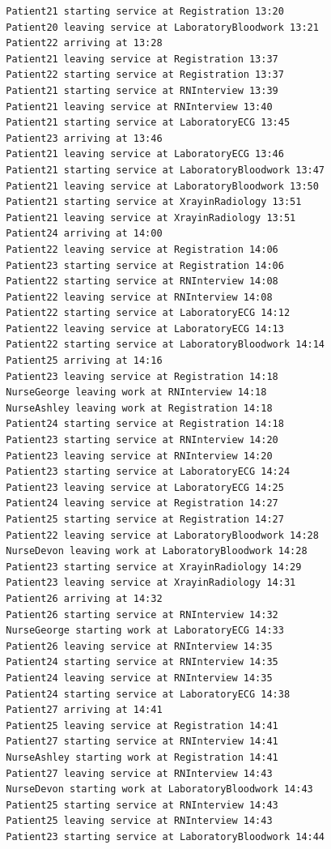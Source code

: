 \documentclass[12pt]{article}
\begin{document}
\begin{verbatim}
		Patient21 starting service at Registration 13:20
		Patient20 leaving service at LaboratoryBloodwork 13:21
		Patient22 arriving at 13:28
		Patient21 leaving service at Registration 13:37
		Patient22 starting service at Registration 13:37
		Patient21 starting service at RNInterview 13:39
		Patient21 leaving service at RNInterview 13:40
		Patient21 starting service at LaboratoryECG 13:45
		Patient23 arriving at 13:46
		Patient21 leaving service at LaboratoryECG 13:46
		Patient21 starting service at LaboratoryBloodwork 13:47
		Patient21 leaving service at LaboratoryBloodwork 13:50
		Patient21 starting service at XrayinRadiology 13:51
		Patient21 leaving service at XrayinRadiology 13:51
		Patient24 arriving at 14:00
		Patient22 leaving service at Registration 14:06
		Patient23 starting service at Registration 14:06
		Patient22 starting service at RNInterview 14:08
		Patient22 leaving service at RNInterview 14:08
		Patient22 starting service at LaboratoryECG 14:12
		Patient22 leaving service at LaboratoryECG 14:13
		Patient22 starting service at LaboratoryBloodwork 14:14
		Patient25 arriving at 14:16
		Patient23 leaving service at Registration 14:18
		NurseGeorge leaving work at RNInterview 14:18
		NurseAshley leaving work at Registration 14:18
		Patient24 starting service at Registration 14:18
		Patient23 starting service at RNInterview 14:20
		Patient23 leaving service at RNInterview 14:20
		Patient23 starting service at LaboratoryECG 14:24
		Patient23 leaving service at LaboratoryECG 14:25
		Patient24 leaving service at Registration 14:27
		Patient25 starting service at Registration 14:27
		Patient22 leaving service at LaboratoryBloodwork 14:28
		NurseDevon leaving work at LaboratoryBloodwork 14:28
		Patient23 starting service at XrayinRadiology 14:29
		Patient23 leaving service at XrayinRadiology 14:31
		Patient26 arriving at 14:32
		Patient26 starting service at RNInterview 14:32
		NurseGeorge starting work at LaboratoryECG 14:33
		Patient26 leaving service at RNInterview 14:35
		Patient24 starting service at RNInterview 14:35
		Patient24 leaving service at RNInterview 14:35
		Patient24 starting service at LaboratoryECG 14:38
		Patient27 arriving at 14:41
		Patient25 leaving service at Registration 14:41
		Patient27 starting service at RNInterview 14:41
		NurseAshley starting work at Registration 14:41
		Patient27 leaving service at RNInterview 14:43
		NurseDevon starting work at LaboratoryBloodwork 14:43
		Patient25 starting service at RNInterview 14:43
		Patient25 leaving service at RNInterview 14:43
		Patient23 starting service at LaboratoryBloodwork 14:44

\end{verbatim}
\end{document}
